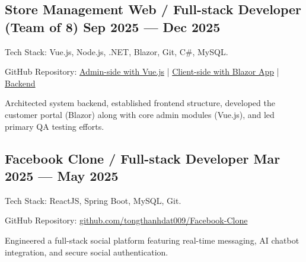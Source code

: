 \subsection{\texorpdfstring{Store Management Web / Full-stack Developer (Team of 8) \hfill Sep 2025 --- Dec 2025}{ROLE / PROJECT E - MMM YYYY --- MMM YYYY}}
\begin{zitemize}
    \item Tech Stack: Vue.js, Node.js, .NET, Blazor, Git, C\#, MySQL.
    \item GitHub Repository: \href{https://github.com/tongthanhdat009/dotnet-frontend}{Admin-side with Vue.js} 
    | \href{https://github.com/tongthanhdat009/BlazorApp}{Client-side with Blazor App} 
    | \href{https://github.com/tongthanhdat009/dotnet-backend}{Backend}
    \item Architected system backend, established frontend structure, developed the customer portal (Blazor) along with core admin modules (Vue.js), and led primary QA testing efforts.
\end{zitemize}

\subsection{\texorpdfstring{Facebook Clone / Full-stack Developer \hfill Mar 2025 --- May 2025}{ROLE / PROJECT G - MMM YYYY --- MMM YYYY}}
\begin{zitemize}
    \item Tech Stack: ReactJS, Spring Boot, MySQL, Git.
   \item GitHub Repository: \href{https://github.com/tongthanhdat009/facebook-clone}{github.com/tongthanhdat009/Facebook-Clone}
   \item Engineered a full-stack social platform featuring real-time messaging, AI chatbot integration, and secure social authentication.
\end{zitemize}


